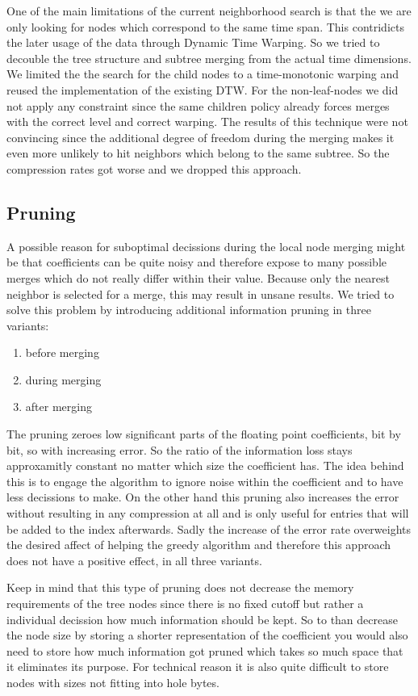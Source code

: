 One of the main limitations of the current neighborhood search is that the we are only looking for nodes which correspond to the same time span. This contridicts the later usage of the data through Dynamic Time Warping. So we tried to decouble the tree structure and subtree merging from the actual time dimensions. We limited the the search for the child nodes to a time-monotonic warping and reused the implementation of the existing DTW. For the non-leaf-nodes we did not apply any constraint since the same children policy already forces merges with the correct level and correct warping. The results of this technique were not convincing since the additional degree of freedom during the merging makes it even more unlikely to hit neighbors which belong to the same subtree. So the compression rates got worse and we dropped this approach.


\subsection{Pruning}
\label{ssec:algorithm:fail:pruning}

A possible reason for suboptimal decissions during the local node merging might be that coefficients can be quite noisy and therefore expose to many possible merges which do not really differ within their value. Because only the nearest neighbor is selected for a merge, this may result in unsane results. We tried to solve this problem by introducing additional information pruning in three variants:

\begin{enumerate}
    \item before merging
    \item during merging
    \item after merging
\end{enumerate}

The pruning zeroes low significant parts of the floating point coefficients, bit by bit, so with increasing error. So the ratio of the information loss stays approxamitly constant no matter which size the coefficient has. The idea behind this is to engage the algorithm to ignore noise within the coefficient and to have less decissions to make. On the other hand this pruning also increases the error without resulting in any compression at all and is only useful for entries that will be added to the index afterwards. Sadly the increase of the error rate overweights the desired affect of helping the greedy algorithm and therefore this approach does not have a positive effect, in all three variants.

Keep in mind that this type of pruning does not decrease the memory requirements of the tree nodes since there is no fixed cutoff but rather a individual decission how much information should be kept. So to than decrease the node size by storing a shorter representation of the coefficient you would also need to store how much information got pruned which takes so much space that it eliminates its purpose. For technical reason it is also quite difficult to store nodes with sizes not fitting into hole bytes.
